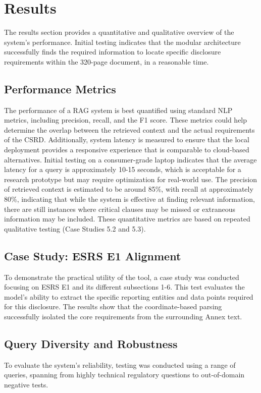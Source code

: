 \documentclass[12pt]{article}
\begin{document}
\section{Results}
The results section provides a quantitative and qualitative overview of the system’s performance. Initial testing indicates that the modular architecture successfully finds the required information to locate specific disclosure requirements within the 320-page document, in a reasonable time. 

\subsection{Performance Metrics}
The performance of a RAG system is best quantified using standard NLP metrics, including precision, recall, and the F1 score. These metrics could help determine the overlap between the retrieved context and the actual requirements of the CSRD. Additionally, system latency is measured to ensure that the local deployment provides a responsive experience that is comparable to cloud-based alternatives. Initial testing on a consumer-grade laptop indicates that the average latency for a query is approximately 10-15 seconds, which is acceptable for a research prototype but may require optimization for real-world use. The precision of retrieved context is estimated to be around 85\%, with recall at approximately 80\%, indicating that while the system is effective at finding relevant information, there are still instances where critical clauses may be missed or extraneous information may be included. These quantitative metrics are based on repeated qualitative testing (Case Studies 5.2 and 5.3).

\subsection{Case Study: ESRS E1 Alignment}
To demonstrate the practical utility of the tool, a case study was conducted focusing on ESRS E1 and its different subsections 1-6. This test evaluates the model’s ability to extract the specific reporting entities and data points required for this disclosure. The results show that the coordinate-based parsing successfully isolated the core requirements from the surrounding Annex text.

\subsection{Query Diversity and Robustness}
To evaluate the system's reliability, testing was conducted using a range of queries, spanning from highly technical regulatory questions to out-of-domain negative tests. 
\end{document}
